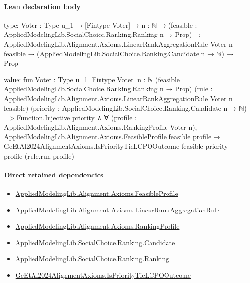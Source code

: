\documentclass[10pt]{article}
\begin{document}
\paragraph{Lean declaration body}
\begin{ReviewVerbatim}
type:
{Voter : Type u_1} →
  [Fintype Voter] →
    {n : ℕ} →
      (feasible : AppliedModelingLib.SocialChoice.Ranking.Ranking n → Prop) →
        AppliedModelingLib.Alignment.Axioms.LinearRankAggregationRule Voter n feasible →
          (AppliedModelingLib.SocialChoice.Ranking.Candidate n → ℕ) → Prop

value:
fun {Voter : Type u_1} [Fintype Voter] {n : ℕ} (feasible : AppliedModelingLib.SocialChoice.Ranking.Ranking n → Prop)
    (rule : AppliedModelingLib.Alignment.Axioms.LinearRankAggregationRule Voter n feasible)
    (priority : AppliedModelingLib.SocialChoice.Ranking.Candidate n → ℕ) =>
  Function.Injective priority ∧
    ∀ (profile : AppliedModelingLib.Alignment.Axioms.RankingProfile Voter n),
      AppliedModelingLib.Alignment.Axioms.FeasibleProfile feasible profile →
        GeEtAl2024AlignmentAxioms.IsPriorityTieLCPOOutcome feasible priority profile (rule.run profile)
\end{ReviewVerbatim}

\paragraph{Direct retained dependencies}
\begin{itemize}\raggedright
\item \hyperlink{library-prerequisite-5fa7bdb49b050adf}{Applied\allowbreak{}Modeling\allowbreak{}Lib.\allowbreak{}Alignment.\allowbreak{}Axioms.\allowbreak{}Feasible\allowbreak{}Profile}
\item \hyperlink{library-prerequisite-43447e121a1884f9}{Applied\allowbreak{}Modeling\allowbreak{}Lib.\allowbreak{}Alignment.\allowbreak{}Axioms.\allowbreak{}Linear\allowbreak{}Rank\allowbreak{}Aggregation\allowbreak{}Rule}
\item \hyperlink{library-prerequisite-9bded048a60dfe0a}{Applied\allowbreak{}Modeling\allowbreak{}Lib.\allowbreak{}Alignment.\allowbreak{}Axioms.\allowbreak{}Ranking\allowbreak{}Profile}
\item \hyperlink{library-prerequisite-8c0e6c25845ae78a}{Applied\allowbreak{}Modeling\allowbreak{}Lib.\allowbreak{}Social\allowbreak{}Choice.\allowbreak{}Ranking.\allowbreak{}Candidate}
\item \hyperlink{library-prerequisite-5cde54446d1ae021}{Applied\allowbreak{}Modeling\allowbreak{}Lib.\allowbreak{}Social\allowbreak{}Choice.\allowbreak{}Ranking.\allowbreak{}Ranking}
\item \hyperlink{governing-declaration-29f61b9b11ddfa38}{Ge\allowbreak{}Et\allowbreak{}Al2024\allowbreak{}Alignment\allowbreak{}Axioms.\allowbreak{}Is\allowbreak{}Priority\allowbreak{}Tie\allowbreak{}LCPO\allowbreak{}Outcome}
\end{itemize}
\hypertarget{governing-declaration-c0a1c58254421de2}{}
\end{document}
